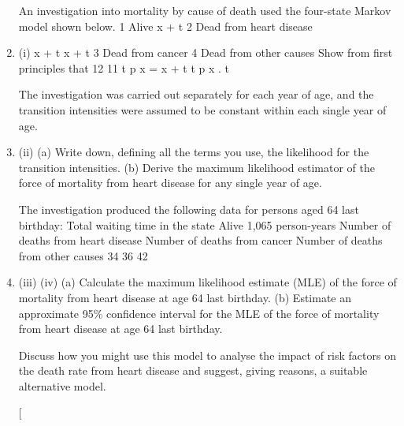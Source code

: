 \documentclass[a4paper,12pt]{article}
\begin{document}
\begin{enumerate}


An investigation into mortality by cause of death used the four-state Markov model
shown below.
1 Alive
x + t
2 Dead from
heart disease
\item (i)
x + t
x + t
3 Dead from
cancer
4 Dead from
other causes
Show from first principles that
12
11
t p x = \mu x + t t p x .
\partial t

The investigation was carried out separately for each year of age, and the transition
intensities were assumed to be constant within each single year of age.
\item (ii)
(a) Write down, defining all the terms you use, the likelihood for the transition intensities.
(b) Derive the maximum likelihood estimator of the force of mortality
from heart disease for any single year of age.

The investigation produced the following data for persons aged 64 last birthday:
Total waiting time in the state Alive 1,065 person-years
Number of deaths from heart disease
Number of deaths from cancer
Number of deaths from other causes 34
36
42
\item (iii)
(iv)
(a) Calculate the maximum likelihood estimate (MLE) of the force of
mortality from heart disease at age 64 last birthday.
(b) Estimate an approximate 95\% confidence interval for the MLE of the
force of mortality from heart disease at age 64 last birthday.

Discuss how you might use this model to analyse the impact of risk factors on
the death rate from heart disease and suggest, giving reasons, a suitable
alternative model.

[



\end{enumerate}
\end{document}
